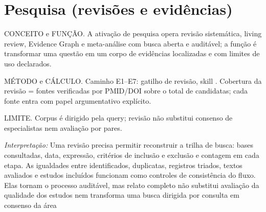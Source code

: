 \section{Pesquisa (revisões e evidências)}
\begin{descricao}
CONCEITO e FUNÇÃO. A ativação de pesquisa opera revisão sistemática, living
review, Evidence Graph e meta-análise com busca aberta e auditável; a função é
transformar uma questão em um corpo de evidências localizadas e com limites de
uso declarados.
\end{descricao}
\begin{metodo}
MÉTODO e CÁLCULO. Caminho E1--E7: gatilho de revisão, skill
. Cobertura da revisão = fontes verificadas por
PMID/DOI sobre o total de candidatas; cada fonte entra com papel
argumentativo explícito.
\end{metodo}
\begin{aviso}
LIMITE. Corpus é dirigido pela query; revisão não substitui consenso de
especialistas nem avaliação por pares.
\end{aviso}
\noindent\textit{Interpretação:} Uma revisão precisa permitir reconstruir a trilha de busca: bases consultadas, data, expressão, critérios de inclusão e exclusão e contagem em cada etapa. As igualdades entre identificados, duplicatas, registros triados, textos avaliados e estudos incluídos funcionam como controles de consistência do fluxo. Elas tornam o processo auditável, mas relato completo não substitui avaliação da qualidade dos estudos nem transforma uma busca dirigida por consulta em consenso da área  %
